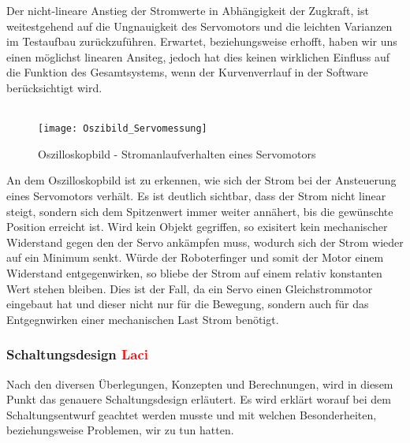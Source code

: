 \documentclass[titlepage,12pt,twoside]{article}
\begin{document}
\hfill \break
Der nicht-lineare Anstieg der Stromwerte in Abhängigkeit der Zugkraft, ist weitestgehend auf die Ungnauigkeit des Servomotors
und die leichten Varianzen im Testaufbau zurückzuführen. Erwartet, beziehungsweise erhofft, haben wir uns einen möglichst linearen
Ansiteg, jedoch hat dies keinen wirklichen Einfluss auf die Funktion des Gesamtsystems, wenn der Kurvenverrlauf in der Software
berücksichtigt wird. \\
\\
\begin{figure}[H]
	\begin{center}
		\scalebox{1.2}
		{\texttt{[image: Oszibild\_Servomessung]}}
		\caption{Oszilloskopbild - Stromanlaufverhalten eines Servomotors}
		\label{fig:Oszibild_Servomessung}	
	\end{center}
\end{figure}
\hfill \break
An dem Oszilloskopbild ist zu erkennen, wie sich der Strom bei der Ansteuerung eines Servomotors verhält. Es ist deutlich sichtbar,
dass der Strom nicht linear steigt, sondern sich dem Spitzenwert immer weiter annähert, bis die gewünschte Position erreicht ist.
Wird kein Objekt gegriffen, so exisitert kein mechanischer Widerstand gegen den der Servo ankämpfen muss, wodurch sich der Strom
wieder auf ein Minimum senkt. Würde der Roboterfinger und somit der Motor einem Widerstand entgegenwirken, so bliebe der Strom auf
einem relativ konstanten Wert stehen bleiben. Dies ist der Fall, da ein Servo einen Gleichstrommotor eingebaut hat und dieser nicht 
nur für die Bewegung, sondern auch für das Entgegnwirken einer mechanischen Last Strom benötigt. 

\subsubsection{Schaltungsdesign \textcolor{red}{Laci}}
Nach den diversen Überlegungen, Konzepten und Berechnungen, wird in diesem Punkt das genauere Schaltungsdesign erläutert. Es wird
erklärt worauf bei dem Schaltungsentwurf geachtet werden musste und mit welchen Besonderheiten, beziehungsweise Problemen, wir zu
tun hatten. 
\end{document}
